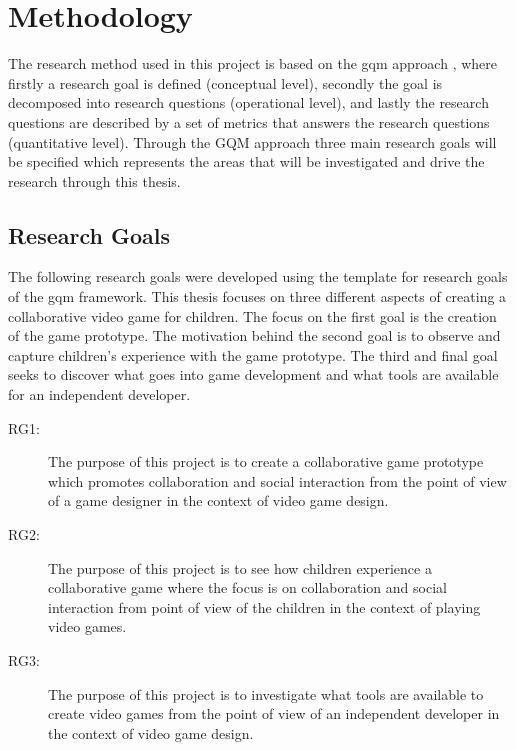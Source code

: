 \chapter{Methodology}
The research method used in this project is based on the \gls{gqm} approach \cite{1992basili}, where firstly a research goal is defined (conceptual level), secondly the goal is decomposed into research questions (operational level), and lastly the research questions are described by a set of metrics that answers the research questions (quantitative level). Through the GQM approach three main research goals will be specified which represents the areas that will be investigated and drive the research through this thesis.


\section{Research Goals}
The following research goals were developed using the template for research goals of the \gls{gqm} framework. This thesis focuses on three different aspects of creating a collaborative video game for children. The focus on the first goal is the creation of the game prototype. The motivation behind the second goal is to observe and capture children's experience with the game prototype. The third and final goal seeks to discover what goes into game development and what tools are available for an independent developer.

\begin{description}
	\item[RG1:] The purpose of this project is to create a collaborative game prototype which promotes collaboration and social interaction from the point of view of a game designer in the context of video game design.
	
	\item[RG2:] The purpose of this project is to see how children experience a collaborative game where the focus is on collaboration and social interaction from point of view of the children in the context of playing video games.
	
	\item[RG3:] The purpose of this project is to investigate what tools are available to create video games from the point of view of an independent developer in the context of video game design. 
\end{description}


